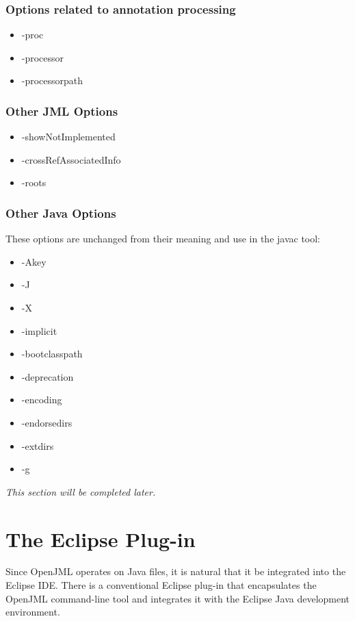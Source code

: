 \documentclass{report}%
\newcommand{\nospace}{\setlength{\itemsep}{0in}\setlength{\parsep}{0in}\setlength{\parskip}{0in}\setlength{\topsep}{0in}}
\begin{document}
\subsection{Options related to annotation processing}
\begin{itemize}
\item -proc
\item -processor
\item -processorpath
\end{itemize}

\subsection{Other JML Options}
\begin{itemize}
\item -showNotImplemented
\item -crossRefAssociatedInfo
\item -roots
\end{itemize}

\subsection{Other Java Options}
These options are unchanged from their meaning and use in the javac tool:
\begin{itemize}\nospace
\item -Akey
\item -J
\item -X
\item -implicit
\item -bootclasspath
\item -deprecation
\item -encoding
\item -endorsedirs
\item -extdirs
\item -g
\end{itemize}
 

\textit{This section will be completed later.} %



\chapter{The Eclipse Plug-in}

Since OpenJML operates on Java files, it is natural that it be integrated into the Eclipse IDE.
There is a conventional Eclipse plug-in that encapsulates the OpenJML command-line tool and integrates it
with the Eclipse Java development environment.
\end{document}
